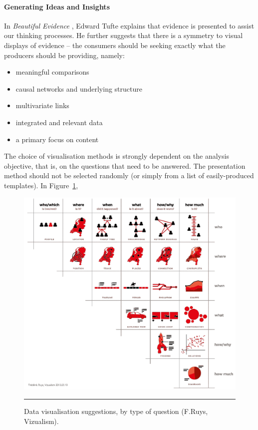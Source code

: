 \paragraph{Generating Ideas and Insights} In \textit{Beautiful Evidence} \cite{DV_T2}, Edward Tufte explains that evidence is presented to assist our thinking processes. He further suggests that there is a symmetry to visual displays of evidence -- the consumers should be seeking exactly what the producers should be providing, namely:
\begin{itemize}[noitemsep, topsep=2pt]
\item meaningful comparisons
\item causal networks and underlying structure
\item multivariate links
\item integrated and relevant data
\item a primary focus on content
\end{itemize}
\vspace{3pt}
The choice of visualisation methods is strongly dependent on the analysis objective, that is, on the questions that need to be answered. The presentation method should not be selected randomly (or simply from a list of easily-produced templates). \newl In Figure~\ref{fig:5W},
\begin{figure}[!t]
\centering
\includegraphics[width=\textwidth]{images/DV/5W_Ruys.png}
\caption[\small Data visualisation suggestions, by type of question ]{\small Data visualisation suggestions, by type of question (F.Ruys, Vizualism).} \hrule\label{fig:5W}
\end{figure}
